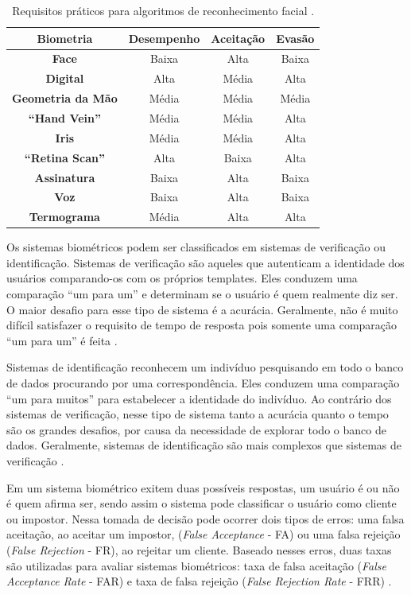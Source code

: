 	\begin{table}[htb]
		\begin{center}
			\caption{Requisitos práticos para algoritmos de reconhecimento facial \cite{milene}.}
			\begin{tabular}{|c|c|c|c|}
				\hline \bf Biometria & \bf Desempenho & \bf Aceitação & \bf Evasão \\
				\hline \hline \bf Face & Baixa & Alta & Baixa\\
				\hline \bf Digital & Alta & Média &  Alta\\
				\hline \bf Geometria da Mão & Média & Média & Média\\
				\hline \bf ``Hand Vein'' & Média & Média & Alta\\
				\hline \bf Iris  & Média & Média & Alta\\
				\hline \bf ``Retina Scan'' & Alta & Baixa & Alta\\
				\hline \bf Assinatura & Baixa & Alta & Baixa \\
				\hline \bf Voz & Baixa & Alta & Baixa \\
				\hline \bf Termograma & Média & Alta & Alta \\
				\hline
			\end{tabular}
		\end{center}
		\label{tabelaRequisitosPraticos}
	\end{table}

Os sistemas biométricos podem ser classificados em sistemas de verificação ou identificação. Sistemas de verificação são aqueles que autenticam a identidade dos usuários comparando-os com os próprios templates. Eles conduzem uma comparação ``um para um'' e determinam se o usuário é quem realmente diz ser. O maior desafio para esse tipo de sistema é a acurácia. Geralmente, não é muito difícil satisfazer o requisito de tempo de resposta pois somente uma comparação ``um para um'' é feita \cite{hong}.

Sistemas de identificação reconhecem um indivíduo pesquisando em todo o banco de dados procurando por uma correspondência. Eles conduzem uma comparação ``um para muitos'' para estabelecer a identidade do indivíduo. Ao contrário dos sistemas de verificação, nesse tipo de sistema tanto a acurácia quanto o tempo são os grandes desafios, por causa da necessidade de explorar todo o banco de dados. Geralmente, sistemas de identificação são mais complexos que sistemas de verificação \cite{hong}.

Em um sistema biométrico exitem duas possíveis respostas, um usuário é ou não é quem afirma ser, sendo assim o sistema pode classificar o usuário como cliente ou impostor. Nessa tomada de decisão pode ocorrer dois tipos de erros: uma falsa aceitação, ao aceitar um impostor, (\textit{False Acceptance} - FA) ou uma falsa rejeição (\textit{False Rejection} - FR), ao rejeitar um cliente. Baseado nesses erros, duas taxas são utilizadas para avaliar sistemas biométricos: taxa de falsa aceitação (\textit{False Acceptance Rate} - FAR) e taxa de falsa rejeição (\textit{False Rejection Rate} - FRR) \cite{drovetto}.

